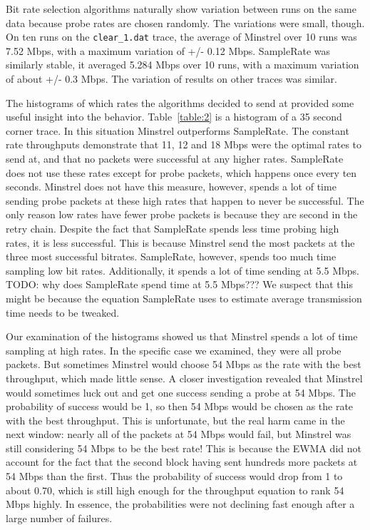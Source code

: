 \documentclass[letterpaper,twocolumn,10pt]{article}
\begin{document}
Bit rate selection algorithms naturally show variation between runs on the same data because probe rates are chosen randomly. The variations were small, though. On ten runs on the \texttt{clear\_1.dat} trace, the average of Minstrel over 10 runs was 7.52 Mbps, with a maximum variation of +/- 0.12 Mbps. SampleRate was similarly stable, it averaged 5.284 Mbps over 10 runs, with a maximum variation of about +/- 0.3 Mbps. The variation of results on other traces was similar.

The histograms of which rates the algorithms decided to send at provided some useful insight into the behavior. Table~\ref{table:2} is a histogram of a 35 second corner trace. In this situation Minstrel outperforms SampleRate. The constant rate throughputs demonstrate that 11, 12 and 18 Mbps were the optimal rates to send at, and that no packets were successful at any higher rates. SampleRate does not use these rates except for probe packets, which happens once every ten seconds. Minstrel does not have this measure, however, spends a lot of time sending probe packets at these high rates that happen to never be successful. The only reason low rates have fewer probe packets is because they are second in the retry chain. Despite the fact that SampleRate spends less time probing high rates, it is less successful. This is because Minstrel send the most packets at the three most successful bitrates. SampleRate, however, spends too much time sampling low bit rates. Additionally, it spends a lot of time sending at 5.5 Mbps. TODO: why does SampleRate spend time at 5.5 Mbps??? We suspect that this might be because the equation SampleRate uses to estimate average transmission time needs to be tweaked. 

Our examination of the histograms showed us that Minstrel spends a lot of time sampling at high rates. In the specific case we examined, they were all probe packets. But sometimes Minstrel would choose 54 Mbps as the rate with the best throughput, which made little sense. A closer investigation revealed that Minstrel would sometimes luck out and get one success sending a probe at 54 Mbps. The probability of success would be 1, so then 54 Mbps would be chosen as the rate with the best throughput. This is unfortunate, but the real harm came in the next window: nearly all of the packets at 54 Mbps would fail, but Minstrel was still considering 54 Mbps to be the best rate! This is because the EWMA did not account for the fact that the second block having sent hundreds more packets at 54 Mbps than the first. Thus the probability of success would drop from 1 to about 0.70, which is still high enough for the throughput equation to rank 54 Mbps highly. In essence, the probabilities were not declining fast enough after a large number of failures.
\end{document}

